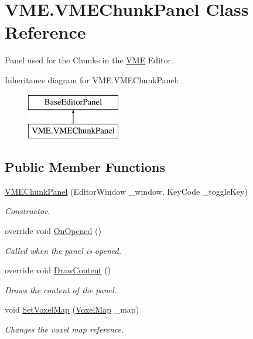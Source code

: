 \hypertarget{class_v_m_e_1_1_v_m_e_chunk_panel}{}\section{V\+M\+E.\+V\+M\+E\+Chunk\+Panel Class Reference}
\label{class_v_m_e_1_1_v_m_e_chunk_panel}


Panel used for the Chunks in the \hyperlink{namespace_v_m_e}{V\+ME} Editor.  


Inheritance diagram for V\+M\+E.\+V\+M\+E\+Chunk\+Panel\+:\begin{figure}[H]
\begin{center}
\leavevmode
\includegraphics[height=2.000000cm]{class_v_m_e_1_1_v_m_e_chunk_panel}
\end{center}
\end{figure}
\subsection*{Public Member Functions}
\begin{DoxyCompactItemize}
\item 
\hyperlink{class_v_m_e_1_1_v_m_e_chunk_panel_afccc00c06110bf4a94a087d880ecec0c}{V\+M\+E\+Chunk\+Panel} (Editor\+Window \+\_\+window, Key\+Code \+\_\+toggle\+Key)
\begin{DoxyCompactList}\small\item\em Constructor. \end{DoxyCompactList}\item 
override void \hyperlink{class_v_m_e_1_1_v_m_e_chunk_panel_a61ffdb0c341b6571f8193a2c4caefb0e}{On\+Opened} ()
\begin{DoxyCompactList}\small\item\em Called when the panel is opened. \end{DoxyCompactList}\item 
override void \hyperlink{class_v_m_e_1_1_v_m_e_chunk_panel_a40223de4b7a04a2dc23a65fc57bfa387}{Draw\+Content} ()
\begin{DoxyCompactList}\small\item\em Draws the content of the panel. \end{DoxyCompactList}\item 
void \hyperlink{class_v_m_e_1_1_v_m_e_chunk_panel_a04dfe486fbbd8f3e3b9dff22d314ae0f}{Set\+Voxel\+Map} (\hyperlink{class_voxel_map}{Voxel\+Map} \+\_\+map)
\begin{DoxyCompactList}\small\item\em Changes the voxel map reference. \end{DoxyCompactList}\end{DoxyCompactItemize}
